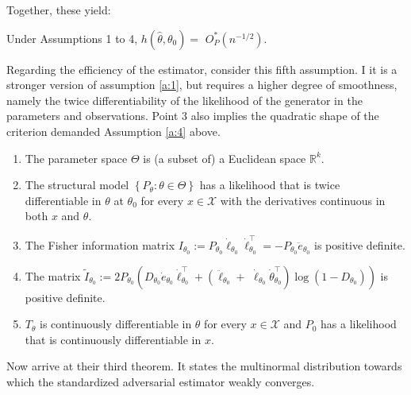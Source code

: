 Together, these yield:
\begin{theorem}
\label{th:kmp_2}
    Under Assumptions 1 to 4, $h\left(\hat{\theta}, \theta_{0}\right)=$ $O_{P}^{*}\left(n^{-1 / 2}\right)$.
\end{theorem}

Regarding the efficiency of the estimator, consider this fifth assumption.
I it is a stronger version of assumption \ref{a:1}, but requires a higher degree of smoothness, namely the twice differentiability of the likelihood of the generator in the parameters and observations.%
Point 3 also implies the quadratic shape of the criterion demanded Assumption \ref{a:4} above. 
\begin{assumption}[A5, KMP]
\label{a:5}
    \begin{enumerate}
        \item The parameter space $\Theta$ is (a subset of) a Euclidean space $\mathbb{R}^{k}$. 
        \item The structural model $\left\{P_{\theta}: \theta \in \Theta\right\}$ has a likelihood that is twice differentiable in $\theta$ at $\theta_{0}$ for every $x \in \mathcal{X}$ with the derivatives continuous in both $x$ and $\theta$. 
        \item The Fisher information matrix $I_{\theta_{0}}:=P_{\theta_{0}} \dot{\ell}_{\theta_{0}} \dot{\ell}_{\theta_{0}}^{\top}=-P_{\theta_{0}} \ddot{e}_{\theta_{0}}$ is positive definite.
        \item The matrix $\tilde{I}_{\theta_{0}}:=2 P_{\theta_{0}}\left(D_{\theta_{0}} \dot{e}_{\theta_{0}} \dot{\ell}_{\theta_{0}}^{\top}+\left(\ddot{\ell}_{\theta_{0}}+\right.\right.$ $\left.\left.\dot{\ell}_{\theta_{0}} \dot{\theta}_{\theta_{0}}^{\top}\right) \log \left(1-D_{\theta_{0}}\right)\right)$ is positive definite.
        \item $T_{\theta}$ is continuously differentiable in $\theta$ for every $x \in \mathcal{X}$ and $P_{0}$ has a likelihood that is continuously differentiable in $x$.
    \end{enumerate}
\end{assumption}

Now \textcite{kaji2023adversarial} arrive at their third theorem.
It states the multinormal distribution towards which the standardized adversarial estimator weakly converges.
 
